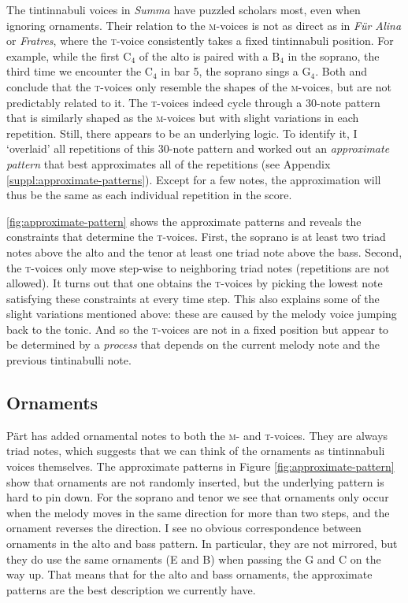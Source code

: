 \documentclass{interact}
\newcommand{\spn}[2]{\text{#1}_{#2}}
\newcommand{\MM}{\textsc{m}}
\newcommand{\TT}{\textsc{t}}
\begin{document}
The tintinnabuli voices in \emph{Summa} have puzzled scholars most, even when ignoring ornaments.
Their relation to the \MM-voices is not as direct as in \emph{Für Alina} or \emph{Fratres}, where the \TT-voice consistently takes a fixed tintinnabuli position.
For example, while the first $\spn{C}{4}$ of the alto is paired with a $\spn{B}{4}$ in the soprano, the third time we encounter the $\spn{C}{4}$ in bar 5, the soprano sings a $\spn{G}{4}$.
Both \textcite{Hillier1997} and \textcite{Patrick2011} conclude that the \TT-voices only resemble the shapes of the \MM-voices, but are not predictably related to it.
The \TT-voices indeed cycle through a 30-note pattern that is similarly shaped as the \MM-voices but with slight variations in each repetition.
Still, there appears to be an underlying logic.
To identify it, I `overlaid' all repetitions of this 30-note pattern and worked out an \emph{approximate pattern} that best approximates all of the repetitions (see Appendix \ref{suppl:approximate-patterns}).
Except for a few notes, the approximation will thus be the same as each individual repetition in the score.

\autoref{fig:approximate-pattern} shows the approximate patterns and reveals the constraints that determine the \TT-voices.
First, the soprano is at least two triad notes above the alto and the tenor at least one triad note above the bass.
Second, the \TT-voices only move step-wise to neighboring triad notes (repetitions are not allowed).
It turns out that one obtains the \TT-voices by picking the lowest note satisfying these constraints at every time step.
This also explains some of the slight variations mentioned above: these are caused by the melody voice jumping back to the tonic.
And so the \TT-voices are not in a fixed position but appear to be determined by a \emph{process} that depends on the current melody note and the previous tintinabulli note.


\subsection{Ornaments}

P\"art has added ornamental notes to both the \MM- and \TT-voices.
They are always triad notes, which suggests that we can think of the ornaments as tintinnabuli voices themselves.
The approximate patterns in Figure \ref{fig:approximate-pattern} show that ornaments are not randomly inserted, but the underlying pattern is hard to pin down.
For the soprano and tenor we see that ornaments only occur when the melody moves in the same direction for more than two steps, and the ornament reverses the direction.
I see no obvious correspondence between ornaments in the alto and bass pattern.
In particular, they are not mirrored, but they do use the same ornaments (E and B) when passing the G and C on the way up.
That means that for the alto and bass ornaments, the approximate patterns are the best description we currently have.
\end{document}
